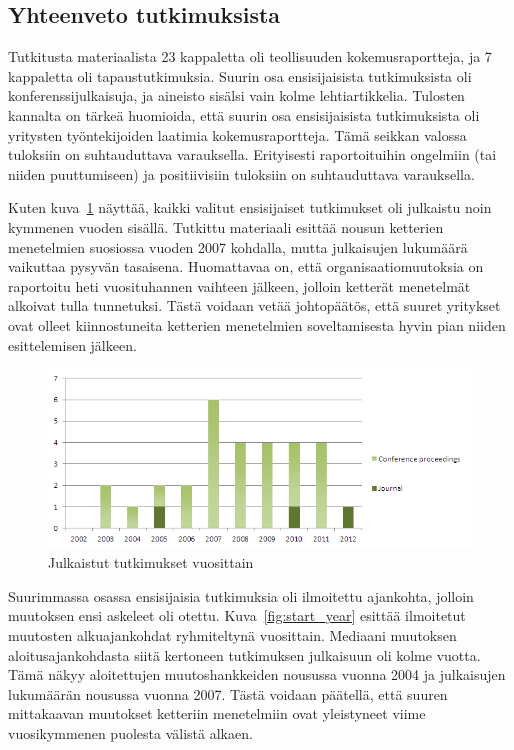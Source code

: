 \subsection{Yhteenveto tutkimuksista}

Tutkitusta materiaalista 23 kappaletta oli teollisuuden kokemusraportteja, ja 7
kappaletta oli tapaustutkimuksia. Suurin osa ensisijaisista tutkimuksista oli
konferenssijulkaisuja, ja aineisto sisälsi vain kolme lehtiartikkelia. Tulosten
kannalta on tärkeä huomioida, että suurin osa ensisijaisista tutkimuksista oli
yritysten työntekijoiden laatimia kokemusraportteja. Tämä seikkan valossa
tuloksiin on suhtauduttava varauksella. Erityisesti raportoituihin ongelmiin
(tai niiden puuttumiseen) ja positiivisiin tuloksiin on suhtauduttava
varauksella.

Kuten kuva~\ref{fig:publications} näyttää, kaikki valitut ensisijaiset
tutkimukset oli julkaistu noin kymmenen vuoden sisällä. Tutkittu materiaali
esittää nousun ketterien menetelmien suosiossa vuoden 2007 kohdalla, mutta
julkaisujen lukumäärä vaikuttaa pysyvän tasaisena. Huomattavaa on, että
organisaatiomuutoksia on raportoitu heti vuosituhannen vaihteen jälkeen, jolloin
ketterät menetelmät alkoivat tulla tunnetuksi. Tästä voidaan vetää johtopäätös,
että suuret yritykset ovat olleet kiinnostuneita ketterien menetelmien
soveltamisesta hyvin pian niiden esittelemisen jälkeen.

\begin{figure}[htb]
  \begin{center}
    \includegraphics[width=1\textwidth]{img/Publications}
    \caption{Julkaistut tutkimukset vuosittain}
    \label{fig:publications}
  \end{center}
\end{figure}

Suurimmassa osassa ensisijaisia tutkimuksia oli ilmoitettu ajankohta, jolloin
muutoksen ensi askeleet oli otettu. Kuva~\ref{fig:start_year} esittää ilmoitetut
muutosten alkuajankohdat ryhmiteltynä vuosittain. Mediaani muutoksen
aloitusajankohdasta siitä kertoneen tutkimuksen julkaisuun oli kolme vuotta.
Tämä näkyy aloitettujen muutoshankkeiden nousussa vuonna 2004 ja julkaisujen
lukumäärän nousussa vuonna 2007. Tästä voidaan päätellä, että suuren mittakaavan
muutokset ketteriin menetelmiin ovat yleistyneet viime vuosikymmenen puolesta
välistä alkaen.

